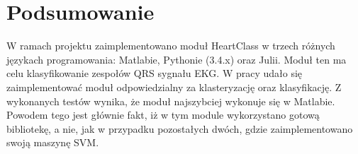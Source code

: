 \section{Podsumowanie}

W ramach projektu zaimplementowano moduł HeartClass w trzech różnych językach programowania: Matlabie, Pythonie (3.4.x) oraz Julii. Moduł ten ma celu klasyfikowanie zespołów QRS sygnału EKG. W pracy udało się zaimplementować moduł odpowiedzialny za klasteryzację oraz klasyfikację. Z wykonanych testów wynika, że moduł najszybciej wykonuje się w Matlabie. Powodem tego jest głównie fakt, iż w tym module wykorzystano gotową bibliotekę, a nie, jak w przypadku pozostałych dwóch, gdzie zaimplementowano swoją maszynę SVM. 

